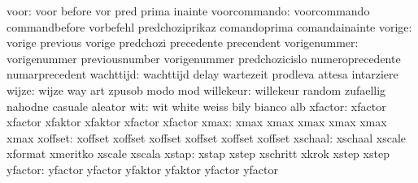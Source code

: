                      voor: voor                      before
                           vor                       pred
                           prima                     inainte
             voorcommando: voorcommando              commandbefore
                           vorbefehl                 predchoziprikaz
                           comandoprima              comandainainte
                   vorige: vorige                    previous
                           vorige                    predchozi
                           precedente                precendent
             vorigenummer: vorigenummer              previousnumber
                           vorigenummer              predchozicislo
                           numeroprecedente          numarprecedent
                wachttijd: wachttijd                 delay
                           wartezeit                 prodleva
                           attesa                    intarziere
                    wijze: wijze                     way
                           art                       zpusob
                           modo                      mod
                willekeur: willekeur                 random
                           zufaellig                 nahodne
                           casuale                   aleator
                      wit: wit                       white
                           weiss                     bily
                           bianco                    alb
                  xfactor: xfactor                   xfactor
                           xfaktor                   xfaktor
                           xfactor                   xfactor %
                     xmax: xmax                      xmax
                           xmax                      xmax
                           xmax                      xmax %
                  xoffset: xoffset                   xoffset
                           xoffset                   xoffset
                           xoffset                   xoffset %
                  xschaal: xschaal                   xscale
                           xformat                   xmeritko
                           xscale                    xscala %
                    xstap: xstap                     xstep
                           xschritt                  xkrok
                           xstep                     xstep %
                  yfactor: yfactor                   yfactor
                           yfaktor                   yfaktor
                           yfactor                   yfactor %
